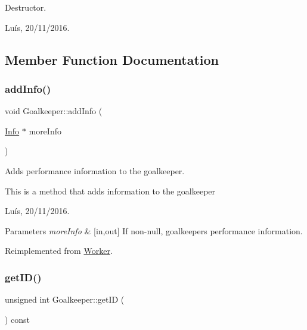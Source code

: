 Destructor. 

Luís, 20/11/2016. 

\subsection{Member Function Documentation}
\hypertarget{class_goalkeeper_a97fc43118c67d500d7d56abc9c0029fe}{}\label{class_goalkeeper_a97fc43118c67d500d7d56abc9c0029fe} 
\subsubsection{\texorpdfstring{add\+Info()}{addInfo()}}
{\footnotesize\ttfamily void Goalkeeper\+::add\+Info (\begin{DoxyParamCaption}\item[{\hyperlink{class_info}{Info} $\ast$}]{more\+Info }\end{DoxyParamCaption})\hspace{0.3cm}{\ttfamily [virtual]}}



Adds performance information to the goalkeeper. 

This is a method that adds information to the goalkeeper

Luís, 20/11/2016. 


\begin{DoxyParams}{Parameters}
{\em more\+Info} & \mbox{[}in,out\mbox{]} If non-\/null, goalkeeper\textquotesingle{}s performance information. \\
\hline
\end{DoxyParams}


Reimplemented from \hyperlink{class_worker_ad54db262f7473cc729c371dd54e292eb}{Worker}.

\hypertarget{class_goalkeeper_a61cff0476146d2fc063d5ed7be82a123}{}\label{class_goalkeeper_a61cff0476146d2fc063d5ed7be82a123} 
\subsubsection{\texorpdfstring{get\+I\+D()}{getID()}}
{\footnotesize\ttfamily unsigned int Goalkeeper\+::get\+ID (\begin{DoxyParamCaption}{ }\end{DoxyParamCaption}) const\hspace{0.3cm}{\ttfamily [virtual]}}




